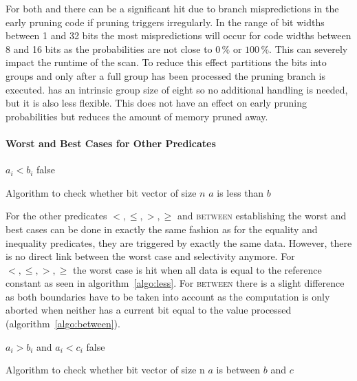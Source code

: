 For both \bwv{} and \bs{} there can be a significant hit due to branch
mispredictions in the early pruning code if pruning triggers irregularly. In the
range of bit widths between 1 and 32 bits the most mispredictions will occur for
code widths between 8 and 16 bits as the probabilities are not close to $0\,\%$
or $100\,\%$. This can severely impact the runtime of the scan.  To
reduce this effect \bwv{} partitions the bits into groups and only after a full
group has been processed the pruning branch is executed. \bs{} has an intrinsic
group size of eight so no additional handling is needed, but it is also less
flexible. This does not have an effect on early pruning probabilities but
reduces the amount of memory pruned away.

\paragraph{Worst and Best Cases for Other Predicates}

\begin{algorithm}[h]
\begin{algorithmic}[1]
        \State \Return $a_i < b_i$
      \EndIf
    \EndFor
    \State \Return false
  \EndProcedure
\end{algorithmic}
\caption{Algorithm to check whether bit vector of size $n$ $a$ is less than $b$}
\label{algo:less}
\end{algorithm}

For the other predicates $<,\le,>,\ge$ and \textsc{between} establishing the
worst and best cases can be done in exactly the same fashion as for the
equality and inequality predicates, they are triggered by exactly the same data.
However, there is no direct link between the worst case and selectivity
anymore. For $<,\le,>,\ge$ the worst case is hit when all data is
equal to the reference constant as seen in algorithm~\ref{algo:less}. For
\textsc{between} there is a slight difference as both boundaries have to be
taken into account as the computation is only aborted when neither has a current
bit equal to the value processed (algorithm~\ref{algo:between}).

\begin{algorithm}[h]
\begin{algorithmic}[1]
        \State \Return $a_i > b_i$ and $a_i < c_i$
      \EndIf
    \EndFor
    \State \Return false
  \EndProcedure
\end{algorithmic}
\caption{Algorithm to check whether bit vector of size n $a$ is between $b$ and $c$}
\label{algo:between}
\end{algorithm}

